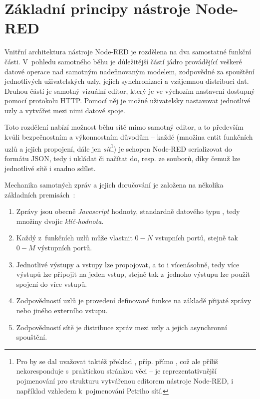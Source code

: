 \section{Základní principy nástroje Node-RED}\label{sec:zakladni-principy-node-red}

Vnitřní architektura nástroje Node-RED je rozdělena na dva samostatné funkční části.
V~pohledu samotného běhu je důležitější částí jádro provádějící veškeré datové operace nad samotným nadefinovaným
modelem, zodpovědné za spouštění jednotlivých uživatelských uzly, jejich synchronizaci a vzájemnou distribuci dat.
Druhou částí je samotný vizuální editor, který je ve výchozím nastavení dostupný pomocí protokolu HTTP. Pomocí něj je
možné uživatelsky nastavovat jednotlivé uzly a vytvářet mezi nimi datové spoje.

Toto rozdělení nabízí možnost běhu sítě mimo samotný editor, a to především kvůli bezpečnostním a
výkonnostním důvodům -- každé  (množina entit funkčních uzlů a jejich propojení, dále jen
\emph{sít}\footnote{Pro  by se dal uvažovat taktéž překlad ,
příp. přímo , což ale příliš nekoresponduje s~praktickou stránkou věci --  je reprezentativnější
pojmenování pro strukturu vytvářenou editorem nástroje Node-RED, i například vzhledem k~pojmenování Petriho sítí.}) je
schopen Node-RED serializovat do formátu JSON, tedy i ukládat či načítat do, resp. ze souborů, díky čemuž lze jednotlivé
sítě i snadno sdílet.

Mechanika samotných zpráv a jejich doručování je založena na několika základních premisách~\cite{NodeRedFlows}:
\begin{enumerate}
    \item Zprávy jsou obecně \emph{Javascript} hodnoty, standardně datového typu ,
    tedy množiny dvojic \emph{klíč-hodnota}.
    \item Každý z~funkčních uzlů může vlastnit $0-N$ vstupních portů, stejně tak $0-M$ výstupních portů.
    \item Jednotlivé výstupy a vstupy lze propojovat, a to i vícenásobně, tedy více výstupů lze připojit na jeden vstup,
    stejně tak z~jednoho výstupu lze použít spojení do více vstupů.
    \item Zodpovědností uzlů je provedení definované funkce na základě přijaté zprávy nebo
    jiného externího vstupu.
    \item Zodpovědností sítě je distribuce zpráv mezi uzly a jejich asynchronní spouštění.
\end{enumerate}

